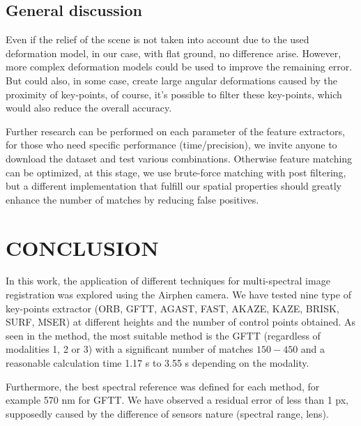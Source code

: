 \documentclass[a4paper,twoside]{article}
\begin{document}
	\subsection{General discussion}
	
	\par Even if the relief of the scene is not taken into account due to the used deformation model,
	in our case, with flat ground, no difference arise.
	However, more complex deformation models  \cite{Lombaert, ThinPlateSpline}
	could be used to improve the remaining error.
	But could also, in some case, create large angular deformations caused by the proximity of key-points,
	of course, it's possible to filter these key-points, which would also reduce the overall accuracy.
	\\
	\linebreak
	\par Further research can be performed on each parameter of the feature extractors, for those who need specific performance (time/precision),
	we invite anyone to download the dataset and test various combinations.
	Otherwise feature matching can be optimized, at this stage, we use brute-force matching with post filtering,
	but a different implementation that fulfill our spatial properties should greatly enhance the number of matches by reducing false positives.
	
	
	\section{\uppercase{Conclusion}}
	\label{sec:conclusion}
	
	\par In this work, the application of different techniques for multi-spectral image registration was explored using the Airphen camera.
	We have tested nine type of key-points extractor (ORB, GFTT, AGAST, FAST, AKAZE, KAZE, BRISK, SURF, MSER)
	at different heights and the number of control points obtained.
	As seen in the method, the most suitable method is the GFTT (regardless of modalities 1, 2 or 3)
	with a significant number of matches $150-450$ and a reasonable calculation time 1.17 s to 3.55 s depending on the modality.
	\\
	\par Furthermore, the best spectral reference was defined for each method, for example 570 nm for GFTT.
	We have observed a residual error of less than 1 px, supposedly caused by the difference of sensors nature (spectral range, lens).
	
\end{document}
